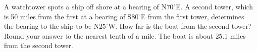 { A watchtower spots a ship off shore at a bearing of N$70^{\circ}$E.  A second tower, which is 50 miles from the first at a bearing of S$80^{\circ}$E from the first tower, determines the bearing to the ship to be N$25^{\circ}$W. How far is the boat from the second tower?  Round your answer to the nearest tenth of a mile.}
{The boat is about 25.1 miles from the second tower.}
